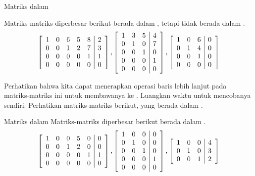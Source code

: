 \begin{example}{Matriks dalam \EF}\label{exa:matricesnotrref}


Matriks-matriks diperbesar berikut berada dalam \ef, tetapi tidak berada dalam \rref.
\begin{equation*}
\left[
\begin{array}{rrrrr|r}
1 & 0 & 6 & 5 & 8 & 2 \\
0 & 0 & 1 & 2 & 7 & 3 \\
0 & 0 & 0 & 0 & 1 & 1 \\
0 & 0 & 0 & 0 & 0 & 0
\end{array}
\right] ,\left[
\begin{array}{rrr|r}
1 & 3 & 5 & 4 \\
0 & 1 & 0 & 7 \\
0 & 0 & 1 & 0 \\
0 & 0 & 0 & 1 \\
0 & 0 & 0 & 0
\end{array}
\right], \left[
\begin{array}{rrr|r}
1 & 0 & 6 & 0 \\
0 & 1 & 4 & 0 \\
0 & 0 & 1 & 0 \\
0 & 0 & 0 & 0
\end{array}
\right]
\end{equation*}
\end{example}

Perhatikan bahwa kita dapat menerapkan operasi baris lebih lanjut pada matriks-matriks ini untuk membawanya ke \rref. Luangkan waktu untuk mencobanya sendiri.
Perhatikan matriks-matriks berikut, yang berada dalam \rref.

\begin{example}{Matriks dalam \RREF}\label{exa:rrefmatrices}
Matriks-matriks diperbesar berikut berada dalam \rref.
\begin{equation*}
\left[
\begin{array}{rrrrr|r}
1 & 0 & 0 & 5 & 0 & 0 \\
0 & 0 & 1 & 2 & 0 & 0 \\
0 & 0 & 0 & 0 & 1 & 1 \\
0 & 0 & 0 & 0 & 0 & 0
\end{array}
\right] ,\left[
\begin{array}{rrr|r}
1 & 0 & 0 & 0 \\
0 & 1 & 0 & 0 \\
0 & 0 & 1 & 0 \\
0 & 0 & 0 & 1 \\
0 & 0 & 0 & 0
\end{array}
\right] , \left[
\begin{array}{rrr|r}
1 & 0 & 0 & 4 \\
0 & 1 & 0 & 3 \\
0 & 0 & 1 & 2 
\end{array}
\right]
\end{equation*}
\end{example}


